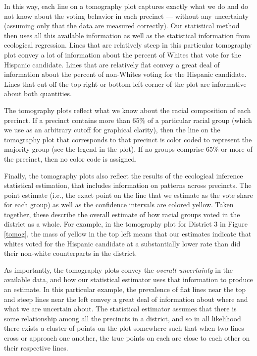 \documentclass[12pt,draft]{scrartcl}
\begin{document}
In this way, each line on a tomography plot captures exactly what we
do and do not know about the voting behavior in each precinct ---
without any uncertainty (assuming only that the data are measured
correctly). Our statistical method then uses all this available
information as well as the statistical information from ecological
regression. Lines that are relatively steep in this particular
tomography plot convey a lot of information about the percent of
Whites that vote for the Hispanic candidate.  Lines that are
relatively flat convey a great deal of information about the percent
of non-Whites voting for the Hispanic candidate.  Lines that cut off
the top right or bottom left corner of the plot are informative about
both quantities.

The tomography plots reflect what we know about the racial composition
of each precinct. If a precinct contains more than 65\% of a
particular racial group (which we use as an arbitrary cutoff for
graphical clarity), then the line on the tomography plot that
corresponds to that precinct is color coded to represent the majority
group (see the legend in the plot). If no groups comprise 65\% or more
of the precinct, then no color code is assigned.  

Finally, the tomography plots also reflect the results of the
ecological inference statistical estimation, that includes information
on patterns across precincts. The point estimate (i.e., the exact
point on the line that we estimate as the vote share for each group)
as well as the confidence intervals are colored yellow.  Taken
together, these describe the overall estimate of how racial groups
voted in the district as a whole. For example, in the tomography plot
for District 3 in Figure \ref{tomog}, the mass of yellow in the top
left means that our estimates indicate that whites voted for the
Hispanic candidate at a substantially lower rate than did their
non-white counterparts in the district.  

As importantly, the tomography plots convey the \emph{overall
  uncertainty} in the available data, and how our statistical
estimator uses that information to produce an estimate.  In this
particular example, the prevalence of flat lines near the top and
steep lines near the left convey a great deal of information about
where and what we are uncertain about.  The statistical estimator
assumes that there is some relationship among all the precincts in a
district, and so in all likelihood there exists a cluster of points on
the plot somewhere such that when two lines cross or approach one
another, the true points on each are close to each other on their
respective lines.  
\end{document}
